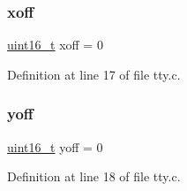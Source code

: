 \subsubsection{\texorpdfstring{xoff}{xoff}}
{\footnotesize\ttfamily \hyperlink{a00095_a273cf69d639a59973b6019625df33e30_a273cf69d639a59973b6019625df33e30}{uint16\+\_\+t} xoff = 0}



Definition at line 17 of file tty.\+c.

\mbox{\label{a00113_a1a7539764d0ae8cd06ce45c62cf92bca_a1a7539764d0ae8cd06ce45c62cf92bca}} 
\subsubsection{\texorpdfstring{yoff}{yoff}}
{\footnotesize\ttfamily \hyperlink{a00095_a273cf69d639a59973b6019625df33e30_a273cf69d639a59973b6019625df33e30}{uint16\+\_\+t} yoff = 0}



Definition at line 18 of file tty.\+c.

